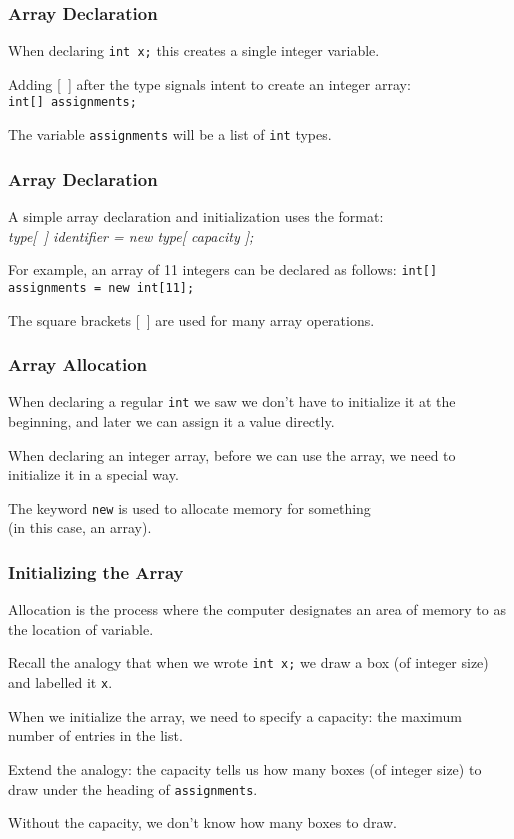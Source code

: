 \begin{frame}
\frametitle{Array Declaration}


When declaring \texttt{int x;} this creates a single integer variable.

Adding [~] after the type signals intent to create an integer array:\\
\quad \texttt{int[] assignments;}

The variable \texttt{assignments} will be a list of \texttt{int} types.

\end{frame}

\begin{frame}
\frametitle{Array Declaration}

A simple array declaration and initialization uses the format:\\
\quad \textit{type[~] identifier = new type[ capacity ];}

For example, an array of 11 integers can be declared as follows:
\texttt{int[] assignments = new int[11];}

The square brackets [~] are used for many array operations.

\end{frame}



\begin{frame}
\frametitle{Array Allocation}
When declaring a regular \texttt{int} we saw we don't have to initialize it at the beginning, and later we can assign it a value directly.

When declaring an integer array, before we can use the array, we need to initialize it in a special way. 

The keyword \texttt{new} is used to \alert{allocate} memory for something\\ \quad (in this case, an array).

\end{frame}

\begin{frame}
\frametitle{Initializing the Array}

Allocation is the process where the computer designates an area of memory to as the location of variable. 

Recall the analogy that when we wrote \texttt{int x;} we draw a box (of integer size) and labelled it \texttt{x}.

When we initialize the array, we need to specify a capacity: the maximum number of entries in the list.

Extend the analogy: the capacity tells us how many boxes (of integer size) to draw under the heading of \texttt{assignments}.

Without the capacity, we don't know how many boxes to draw.

\end{frame}


